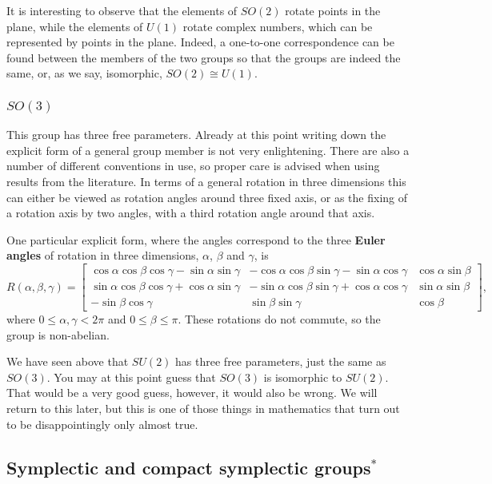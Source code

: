 \documentclass[notes.tex]{subfiles}
\begin{document}
It is interesting to observe that the elements of $SO(2)$ rotate points in the plane, while the elements of $U(1)$ rotate complex numbers, which can be represented by points in the plane. Indeed, a one-to-one correspondence can be found between the members of the two groups so that the groups are indeed the same, or, as we say, isomorphic, $SO(2)\cong U(1)$.

\subsubsection{$SO(3)$}
This group has three free parameters. Already at this point writing down the explicit form of a general group member is not very enlightening. There are also a number of different conventions in use, so proper care is advised when using results from the literature. In terms of a general rotation in three dimensions this can either be viewed as rotation angles around three fixed axis, or as the fixing of a rotation axis by two angles, with a third rotation angle around that axis. 

One particular explicit form, where the angles correspond to the three {\bf Euler angles} of rotation in three dimensions, $\alpha$, $\beta$ and $\gamma$, is
\[
R(\alpha,\beta,\gamma)=\left[\begin{matrix} 
\cos\alpha\cos\beta\cos\gamma-\sin\alpha\sin\gamma & -\cos\alpha\cos\beta\sin\gamma-\sin\alpha\cos\gamma & \cos\alpha\sin\beta  \\ 
\sin\alpha\cos\beta\cos\gamma+\cos\alpha\sin\gamma & -\sin\alpha\cos\beta\sin\gamma+\cos\alpha\cos\gamma & \sin\alpha\sin\beta  \\ 
-\sin\beta\cos\gamma & \sin\beta\sin\gamma  & \cos\beta 
\end{matrix}\right],
\]
where $0\le\alpha,\gamma< 2\pi$ and $0\le\beta\le\pi$. These rotations do not commute, so the group is non-abelian.

We have seen above that $SU(2)$ has three free parameters, just the same as $SO(3)$. You may at this point guess that $SO(3)$ is isomorphic to $SU(2)$. That would be a very good guess, however, it would also be wrong. We will return to this later, but this is one of those things in mathematics that turn out to be disappointingly only almost true.


\subsection{Symplectic and compact symplectic groups$^*$}
\end{document}
